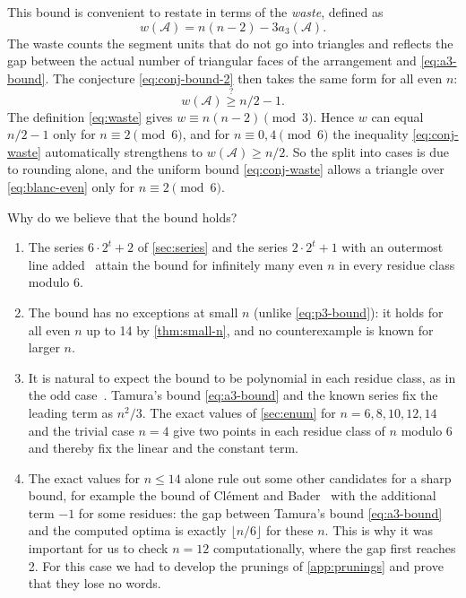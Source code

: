 This bound is convenient to restate in terms of the \emph{waste}, defined as
\begin{equation}\label{eq:waste}
w(\mathcal{A})=n(n-2)-3a_3(\mathcal{A}).
\end{equation}
The waste counts the segment units that do not go into triangles and reflects the gap between the actual number of triangular faces of the arrangement and \eqref{eq:a3-bound}. The conjecture \eqref{eq:conj-bound-2} then takes the same form for all even $n$:
\begin{equation}\label{eq:conj-waste}
w(\mathcal{A})\overset{?}{\ge} n/2-1.
\end{equation}
The definition \eqref{eq:waste} gives $w\equiv n(n-2)\pmod3$. Hence $w$ can equal $n/2-1$ only for $n\equiv2\pmod 6$, and for $n\equiv0,4\pmod 6$ the inequality \eqref{eq:conj-waste} automatically strengthens to $w(\mathcal{A})\ge n/2$. So the split into cases is due to rounding alone, and the uniform bound \eqref{eq:conj-waste} allows a triangle over \eqref{eq:blanc-even} only for $n\equiv2\pmod 6$.

Why do we believe that the bound holds?
\begin{enumerate}
\item The series $6\cdot2^t+2$ of \cref{sec:series} and the series $2\cdot2^t+1$ with an outermost line added~\cite{for,bbl} attain the bound for infinitely many even $n$ in every residue class modulo 6.
\item The bound has no exceptions at small $n$ (unlike \eqref{eq:p3-bound}): it holds for all even $n$ up to 14 by \cref{thm:small-n}, and no counterexample is known for larger $n$.
\item It is natural to expect the bound to be polynomial in each residue class, as in the odd case~\cite{blanc11}. Tamura's bound \eqref{eq:a3-bound} and the known series fix the leading term as $n^2/3$. The exact values of \cref{sec:enum} for $n=6,8,10,12,14$ and the trivial case $n=4$ give two points in each residue class of $n$ modulo 6 and thereby fix the linear and the constant term.
\item The exact values for $n\le14$ alone rule out some other candidates for a sharp bound, for example the bound of Cl\'ement and Bader~\cite{cb07} with the additional term $-1$ for some residues: the gap between Tamura's bound \eqref{eq:a3-bound} and the computed optima is exactly $\lfloor n/6\rfloor$ for these $n$. This is why it was important for us to check $n=12$ computationally, where the gap first reaches 2. For this case we had to develop the prunings of \cref{app:prunings} and prove that they lose no words.
\end{enumerate}

